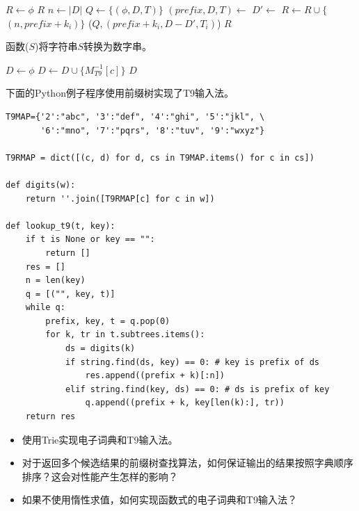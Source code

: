 \documentclass[b5paper]{ctexart}
\begin{document}
\begin{algorithmic}[1]
  \State $R \gets \phi$
    \State \Return $R$
  \EndIf
  \State $n \gets |D|$
  \State $Q \gets \{(\phi, D, T)\}$
    \State $(prefix, D, T) \gets$ 
      \State $D' \gets$ 
       
        \State $R \gets R \cup \{$  $(n, prefix + k_i) \}$ 
        \State {}($Q, (prefix + k_i, D - D', T_i)$)
      \EndIf
    \EndFor
  \EndWhile
  \State \Return $R$
\EndFunction
\end{algorithmic}

函数($S$)将字符串$S$转换为数字串。

\begin{algorithmic}[1]
  \State $D \gets \phi$
    \State $D \gets D \cup \{M^{-1}_{T9}[c]\}$
  \EndFor
  \State \Return $D$
\EndFunction
\end{algorithmic}

下面的Python例子程序使用前缀树实现了T9输入法。

\lstset{language=Python}
\begin{lstlisting}
T9MAP={'2':"abc", '3':"def", '4':"ghi", '5':"jkl", \
       '6':"mno", '7':"pqrs", '8':"tuv", '9':"wxyz"}

T9RMAP = dict([(c, d) for d, cs in T9MAP.items() for c in cs])

def digits(w):
    return ''.join([T9RMAP[c] for c in w])

def lookup_t9(t, key):
    if t is None or key == "":
        return []
    res = []
    n = len(key)
    q = [("", key, t)]
    while q:
        prefix, key, t = q.pop(0)
        for k, tr in t.subtrees.items():
            ds = digits(k)
            if string.find(ds, key) == 0: # key is prefix of ds
                res.append((prefix + k)[:n])
            elif string.find(key, ds) == 0: # ds is prefix of key
                q.append((prefix + k, key[len(k):], tr))
    return res
\end{lstlisting}

\begin{Exercise}
\begin{itemize}
\item 使用Trie实现电子词典和T9输入法。
\item 对于返回多个候选结果的前缀树查找算法，如何保证输出的结果按照字典顺序排序？这会对性能产生怎样的影响？
\item 如果不使用惰性求值，如何实现函数式的电子词典和T9输入法？
\end{itemize}
\end{Exercise}
\end{document}
